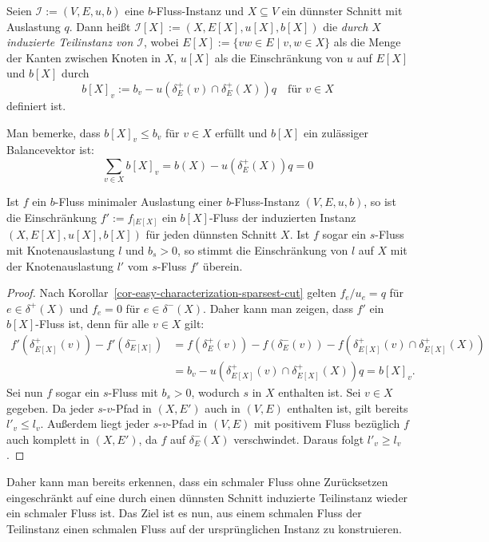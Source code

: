 \begin{definition}
	Seien $\mathcal{I}:=(V, E, u, b)$ eine $b$-Fluss-Instanz und $X\subseteq V$ ein dünnster Schnitt mit Auslastung $q$.
	Dann heißt $\mathcal{I}[X] := (X, E[X], u[X], b[X])$ die \emph{durch $X$ induzierte Teilinstanz von $\mathcal{I}$},
	wobei $E[X] := \{ vw \in E \mid v, w \in X \}$ als die Menge der Kanten zwischen Knoten in $X$, $u[X]$ als die Einschränkung von $u$ auf $E[X]$ und $b[X]$ durch \[
	b[X]_v := b_v - u(\delta^+_E(v)\cap\delta^+_E(X)) q \quad \text{für $v\in X$}
\] definiert ist.
\end{definition}

Man bemerke, dass $b[X]_v \leq b_v$ für $v\in X$ erfüllt und $b[X]$ ein zulässiger Balancevektor ist: \[
	\sum_{v\in X} b[X]_v = b(X) - u(\delta^+_E(X)) q = 0
\]

\begin{proposition}\label{prop-restricted-minimal-flow-is-b-flow-on-induced-instance}
	Ist $f$ ein $b$-Fluss minimaler Auslastung einer $b$-Fluss-Instanz $(V, E, u, b)$, so ist die Einschränkung $f':=f_{\mid E[X]}$ ein $b[X]$-Fluss der induzierten Instanz $(X, E[X], u[X], b[X])$ für jeden dünnsten Schnitt $X$.
	Ist $f$ sogar ein $s$-Fluss mit Knotenauslastung $l$ und $b_s > 0$, so stimmt die Einschränkung von $l$ auf $X$ mit der Knotenauslastung $l'$ vom $s$-Fluss $f'$ überein.
\end{proposition}
\begin{proof}
	Nach Korollar~\ref{cor-easy-characterization-sparsest-cut} gelten $f_{e}/u_{e}=q$ für $e\in\delta^+(X)$ und $f_{e} = 0$ für $e\in\delta^-(X)$.
	Daher kann man zeigen, dass $f'$ ein $b[X]$-Fluss ist, denn für alle $v\in X$ gilt:
	\begin{align*}
	f'(\delta^+_{E[X]}(v)) - f'(\delta^-_{E[X]}) &= f(\delta^+_E(v)) - f(\delta^-_E(v)) - f(\delta^+_{E[X]}(v)\cap\delta^+_{E[X]}(X)) \\
	&= b_v - u(\delta^+_{E[X]}(v)\cap\delta^+_{E[X]}(X))q = b[X]_v.
	\end{align*}
	Sei nun $f$ sogar ein $s$-Fluss mit $b_s > 0$, wodurch $s$ in $X$ enthalten ist.
	Sei $v\in X$ gegeben.
	Da jeder $s$-$v$-Pfad in $(X, E')$ auch in $(V, E)$ enthalten ist, gilt bereits $l'_v\leq l_v$.
	Außerdem liegt jeder $s$-$v$-Pfad in $(V, E)$ mit positivem Fluss bezüglich $f$ auch komplett in $(X, E')$, da $f$ auf $\delta^-_E(X)$ verschwindet.
	Daraus folgt $l'_v \geq l_v$.
\end{proof}

Daher kann man bereits erkennen, dass ein schmaler Fluss ohne Zurücksetzen eingeschränkt auf eine durch einen dünnsten Schnitt induzierte Teilinstanz wieder ein schmaler Fluss ist.
Das Ziel ist es nun, aus einem schmalen Fluss der Teilinstanz einen schmalen Fluss auf der ursprünglichen Instanz zu konstruieren.

